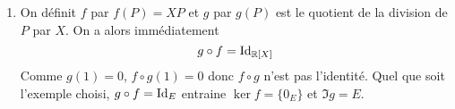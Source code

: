 \begin{enumerate}
\begin{enumerate}
 \item On définit $f$ par $f(P)=XP$ et $g$ par $g(P)$ est le quotient de la division de $P$ par $X$. On a alors immédiatement
\begin{displaymath}
 g\circ f =\operatorname{Id}_{\mathbb{R}[X]}
\end{displaymath}
Comme $g(1)=0$, $f\circ g (1)=0$ donc $f\circ g$ n'est pas l'identité. Quel que soit l'exemple choisi, $g\circ f = \operatorname{Id}_E$ entraine $\ker f = \{0_E\}$ et $\Im g = E$.
\end{enumerate}
\end{enumerate}
